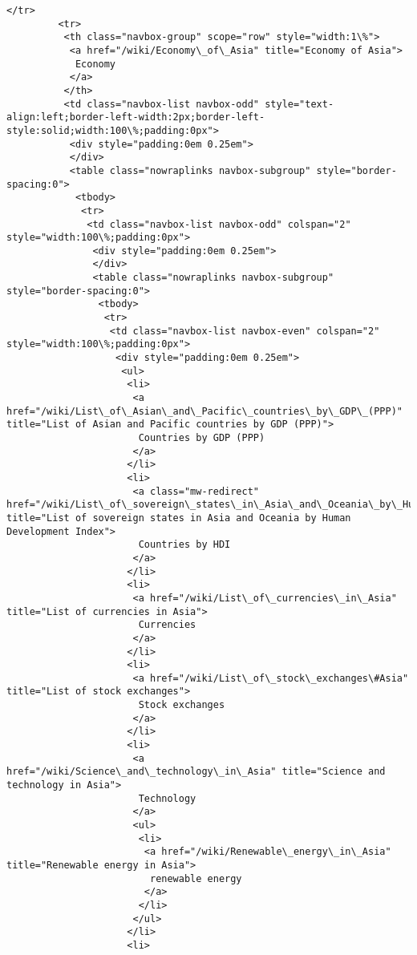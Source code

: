 \documentclass[11pt]{article}
\begin{document}
\begin{Verbatim}[commandchars=\\\{\}]
         </tr>
         <tr>
          <th class="navbox-group" scope="row" style="width:1\%">
           <a href="/wiki/Economy\_of\_Asia" title="Economy of Asia">
            Economy
           </a>
          </th>
          <td class="navbox-list navbox-odd" style="text-align:left;border-left-width:2px;border-left-style:solid;width:100\%;padding:0px">
           <div style="padding:0em 0.25em">
           </div>
           <table class="nowraplinks navbox-subgroup" style="border-spacing:0">
            <tbody>
             <tr>
              <td class="navbox-list navbox-odd" colspan="2" style="width:100\%;padding:0px">
               <div style="padding:0em 0.25em">
               </div>
               <table class="nowraplinks navbox-subgroup" style="border-spacing:0">
                <tbody>
                 <tr>
                  <td class="navbox-list navbox-even" colspan="2" style="width:100\%;padding:0px">
                   <div style="padding:0em 0.25em">
                    <ul>
                     <li>
                      <a href="/wiki/List\_of\_Asian\_and\_Pacific\_countries\_by\_GDP\_(PPP)" title="List of Asian and Pacific countries by GDP (PPP)">
                       Countries by GDP (PPP)
                      </a>
                     </li>
                     <li>
                      <a class="mw-redirect" href="/wiki/List\_of\_sovereign\_states\_in\_Asia\_and\_Oceania\_by\_Human\_Development\_Index" title="List of sovereign states in Asia and Oceania by Human Development Index">
                       Countries by HDI
                      </a>
                     </li>
                     <li>
                      <a href="/wiki/List\_of\_currencies\_in\_Asia" title="List of currencies in Asia">
                       Currencies
                      </a>
                     </li>
                     <li>
                      <a href="/wiki/List\_of\_stock\_exchanges\#Asia" title="List of stock exchanges">
                       Stock exchanges
                      </a>
                     </li>
                     <li>
                      <a href="/wiki/Science\_and\_technology\_in\_Asia" title="Science and technology in Asia">
                       Technology
                      </a>
                      <ul>
                       <li>
                        <a href="/wiki/Renewable\_energy\_in\_Asia" title="Renewable energy in Asia">
                         renewable energy
                        </a>
                       </li>
                      </ul>
                     </li>
                     <li>

\end{Verbatim}
\end{document}
